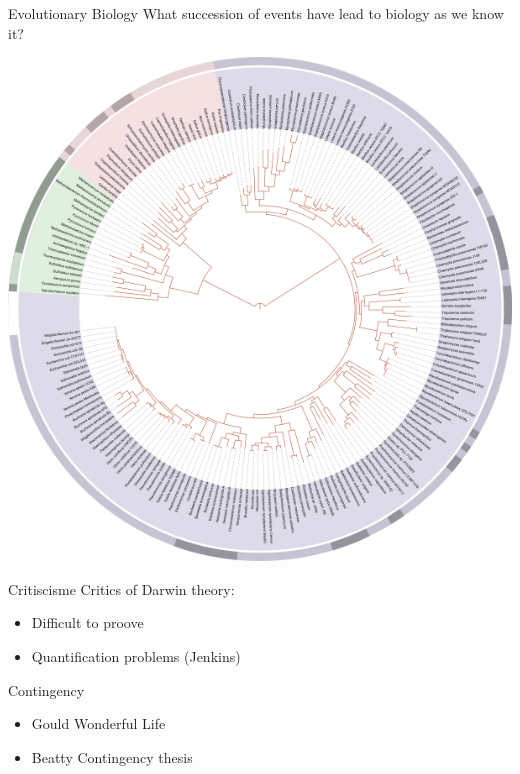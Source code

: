 \documentclass[12pt, notes=show]{beamer}
\begin{document}
\begin{frame}{Evolutionary Biology}
What succession of events have lead to biology as we know it?
	\begin{center}
		\includegraphics[width=.6\textheight]{images/philoLife.png}
	\end{center}
\end{frame}
\begin{frame}{Critiscisme}
    Critics of Darwin theory:
    \begin{itemize}
	\item Difficult to proove
	\item Quantification problems (Jenkins)
    \end{itemize}
\end{frame}

\begin{frame}{Contingency}
	\begin{itemize}
		\item Gould Wonderful Life  
		\item Beatty Contingency thesis
	\end{itemize}
\end{frame}
\end{document}
